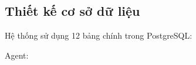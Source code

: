 \subsection{Thiết kế cơ sở dữ liệu}

Hệ thống sử dụng 12 bảng chính trong PostgreSQL:

Agent:

\begin{figure}[H]
\centering
\fbox{\parbox{0.9\textwidth}{\centering\vspace{0.5cm}
\textit{[Hình: Biểu đồ ERD]}\\[0.3cm]
}}
\end{figure}
